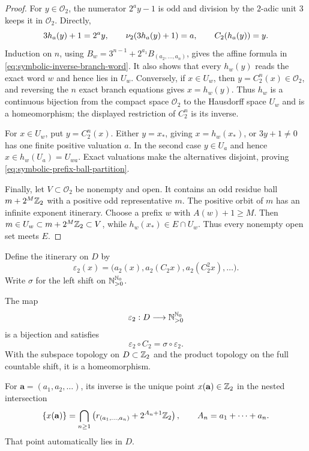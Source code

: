 \begin{proof}
For $y\in\mathcal O_2$, the numerator $2^ay-1$ is odd and division by the
$2$-adic unit $3$ keeps it in $\mathcal O_2$.  Directly,
\[
 3h_a(y)+1=2^ay,
 \qquad \nu_{2}(3h_a(y)+1)=a,
 \qquad C_2(h_a(y))=y.
\]
Induction on $n$, using
$B_w=3^{n-1}+2^{a_1}B_{(a_2,\ldots,a_n)}$, gives the affine formula in
\eqref{eq:symbolic-inverse-branch-word}.  It also shows that every
$h_w(y)$ reads the exact word $w$ and hence lies in $U_w$.  Conversely, if
$x\in U_w$, then $y=C_2^n(x)\in\mathcal O_2$, and reversing the $n$ exact
branch equations gives $x=h_w(y)$.  Thus $h_w$ is a continuous bijection
from the compact space $\mathcal O_2$ to the Hausdorff space $U_w$ and is
a homeomorphism; the displayed restriction of $C_2^n$ is its inverse.

For $x\in U_w$, put $y=C_2^n(x)$.  Either $y=x_*$, giving
$x=h_w(x_*)$, or $3y+1\ne0$ has one finite positive valuation $a$.  In the
second case $y\in U_a$ and hence $x\in h_w(U_a)=U_{wa}$.  Exact valuations
make the alternatives disjoint, proving
\eqref{eq:symbolic-prefix-ball-partition}.

Finally, let $V\subset\mathcal O_2$ be nonempty and open.  It contains an
odd residue ball $m+2^M\mathbb{Z}_{2}$ with a positive odd representative $m$.
The positive orbit of $m$ has an infinite exponent itinerary.  Choose a
prefix $w$ with $A(w)+1\geq M$.  Then
$m\in U_w\subset m+2^M\mathbb{Z}_{2}\subset V$, while
$h_w(x_*)\in E\cap U_w$.  Thus every nonempty open set meets $E$.
\end{proof}

Define the itinerary on $D$ by
\[
 \varepsilon_2(x)=
 \bigl(a_2(x),a_2(C_2x),a_2(C_2^2x),\ldots\bigr).
\]
Write $\sigma$ for the left shift on $\mathbb{N}_{>0}^{\mathbb{N}_{0}}$.

\begin{theorem}
\label{thm:symbolic-survivor-conjugacy}
The map
\[
 \varepsilon_2:D\longrightarrow\mathbb{N}_{>0}^{\mathbb{N}_{0}}
\]
is a bijection and satisfies
\[
 \varepsilon_2\circ C_2=\sigma\circ\varepsilon_2.
\]
With the subspace topology on $D\subset\mathbb{Z}_{2}$ and the product topology on
the full countable shift, it is a homeomorphism.

For $\mathbf a=(a_1,a_2,\ldots)$, its inverse is the unique point
$x(\mathbf a)\in\mathbb{Z}_{2}$ in the nested intersection
\begin{equation}
\label{eq:symbolic-nested-residue-inverse}
 \{x(\mathbf a)\}
 =\bigcap_{n\geq1}
 \left(r_{(a_1,\ldots,a_n)}+2^{A_n+1}\mathbb{Z}_{2}\right),
 \qquad A_n=a_1+\cdots+a_n.
\end{equation}
That point automatically lies in $D$.
\end{theorem}

